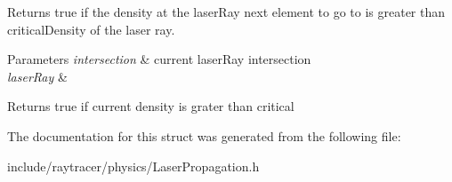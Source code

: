 Returns true if the density at the laser\+Ray next element to go to is greater than critical\+Density of the laser ray. 


\begin{DoxyParams}{Parameters}
{\em intersection} & current laser\+Ray intersection \\
\hline
{\em laser\+Ray} & \\
\hline
\end{DoxyParams}
\begin{DoxyReturn}{Returns}
true if current density is grater than critical 
\end{DoxyReturn}


The documentation for this struct was generated from the following file\+:\begin{DoxyCompactItemize}
\item 
include/raytracer/physics/Laser\+Propagation.\+h\end{DoxyCompactItemize}
